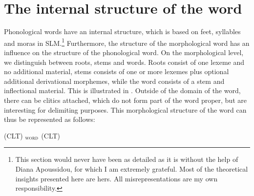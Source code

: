 
\section{The internal structure of the word}\label{sec:phon:Theinternalstructureoftheword}
Phonological words have an internal structure, which is based on feet, syllables and moras in SLM.\footnote{This section would never have been as detailed as it is without the help of Diana Apoussidou, for which I am extremely grateful. Most of the theoretical insights presented here are hers. All misrepresentations are my own responsibility.}
 Furthermore, the structure of the morphological word has an influence on the structure of the phonological word.
On the  morphological level, we distinguish between roots, stems and words. Roots consist of one lexeme and no additional material, stems consists of one or more lexemes plus optional additional derivational morphemes, while the word consists of a stem and inflectional material. This is illustrated in . Outside of the domain of the word, there can be clitics attached, which do not form part of the word proper, but are interesting for delimiting purposes. This morphological structure of the word can thus be represented as follows:

\ea\label{ex:phon:rootsstemswords}
(CLT)
	$_{\textsc{word}}$
	(CLT)
\z

